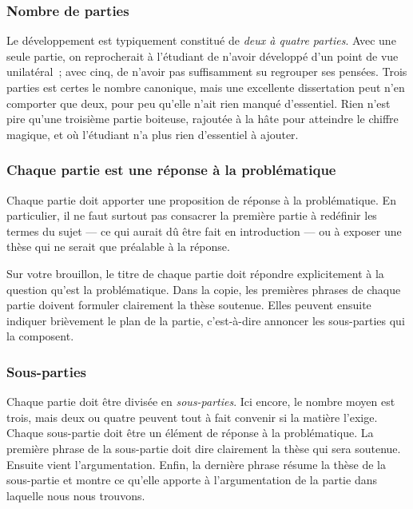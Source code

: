 \documentclass[a4paper,12pt]{article}
\begin{document}
\subsubsection{Nombre de parties}
\label{sec-3-1-1}

Le développement est typiquement constitué de \emph{deux à quatre parties}.
Avec une seule partie, on reprocherait à l'étudiant de n'avoir développé
d'un point de vue unilatéral ; avec cinq, de n'avoir pas suffisamment su
regrouper ses pensées. Trois parties est certes le nombre canonique,
mais une excellente dissertation peut n'en comporter que deux, pour peu
qu'elle n'ait rien manqué d'essentiel. Rien n'est pire qu'une troisième
partie boiteuse, rajoutée à la hâte pour atteindre le chiffre magique,
et où l'étudiant n'a plus rien d'essentiel à ajouter.

\subsubsection{Chaque partie est une réponse à la problématique}
\label{sec-3-1-2}

Chaque partie doit apporter une proposition de réponse à la
problématique. En particulier, il ne faut surtout pas consacrer la
première partie à redéfinir les termes du sujet --- ce qui aurait dû
être fait en introduction --- ou à exposer une thèse qui ne serait que
préalable à la réponse.

Sur votre brouillon, le titre de chaque partie doit répondre
explicitement à la question qu'est la problématique. Dans la copie, les
premières phrases de chaque partie doivent formuler clairement la thèse
soutenue. Elles peuvent ensuite indiquer brièvement le plan de la
partie, c'est-à-dire annoncer les sous-parties qui la composent.

\subsubsection{Sous-parties}
\label{sec-3-1-3}

Chaque partie doit être divisée en \emph{sous-parties}. Ici encore, le nombre
moyen est trois, mais deux ou quatre peuvent tout à fait convenir si la
matière l'exige. Chaque sous-partie doit être un élément de réponse à la
problématique. La première phrase de la sous-partie doit dire clairement
la thèse qui sera soutenue. Ensuite vient l'argumentation. Enfin, la
dernière phrase résume la thèse de la sous-partie et montre ce qu'elle
apporte à l'argumentation de la partie dans laquelle nous nous trouvons.
\end{document}
